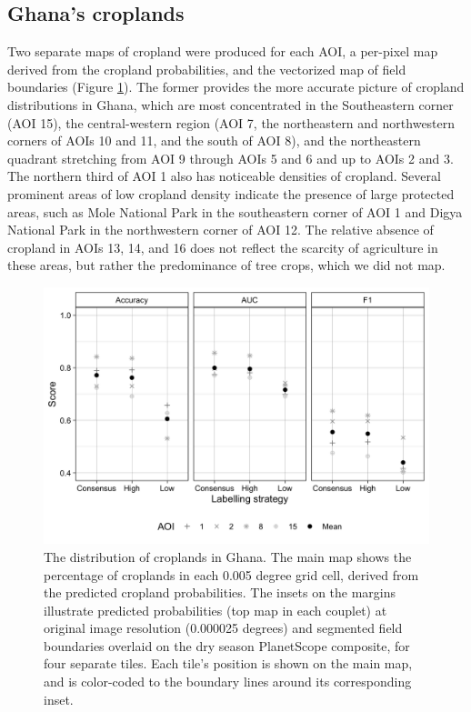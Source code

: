 \documentclass[11pt,a4paper]{article}
\begin{document}
\hypertarget{ghanas-croplands}{%
\subsection{Ghana's croplands}\label{ghanas-croplands}}

Two separate maps of cropland were produced for each AOI, a per-pixel
map derived from the cropland probabilities, and the vectorized map of
field boundaries (Figure \ref{fig:mainmap}). The former provides the
more accurate picture of cropland distributions in Ghana, which are most
concentrated in the Southeastern corner (AOI 15), the central-western
region (AOI 7, the northeastern and northwestern corners of AOIs 10 and
11, and the south of AOI 8), and the northeastern quadrant stretching
from AOI 9 through AOIs 5 and 6 and up to AOIs 2 and 3. The northern
third of AOI 1 also has noticeable densities of cropland. Several
prominent areas of low cropland density indicate the presence of large
protected areas, such as Mole National Park in the southeastern corner
of AOI 1 and Digya National Park in the northwestern corner of AOI 12.
The relative absence of cropland in AOIs 13, 14, and 16 does not reflect
the scarcity of agriculture in these areas, but rather the predominance
of tree crops, which we did not map.

\begin{figure}

{\centering \includegraphics[width=0.9\linewidth]{figures/figure6} 

}

\caption{The distribution of croplands in Ghana. The main map shows the percentage of croplands in each 0.005 degree grid cell, derived from the predicted cropland probabilities. The insets  on the margins illustrate predicted probabilities (top map in each couplet) at original image resolution (0.000025 degrees) and segmented field boundaries overlaid on the dry season PlanetScope composite, for four separate tiles. Each tile's position is shown on the main map, and is color-coded to the boundary lines around its corresponding inset.}\label{fig:mainmap}
\end{figure}
\end{document}
